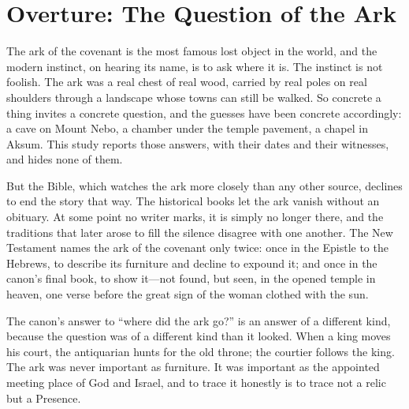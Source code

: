 \section{Overture: The Question of the Ark}

The ark of the covenant is the most famous lost object in the world,
and the modern instinct, on hearing its name, is to ask where it is.
The instinct is not foolish. The ark was a real chest of real wood,
carried by real poles on real shoulders through a landscape whose towns
can still be walked. So concrete a thing invites a concrete question,
and the guesses have been concrete accordingly: a cave on Mount Nebo, a
chamber under the temple pavement, a chapel in Aksum. This study
reports those answers, with their dates and their witnesses, and hides
none of them.

But the Bible, which watches the ark more closely than any other
source, declines to end the story that way. The historical books let
the ark vanish without an obituary. At some point no writer marks, it
is simply no longer there, and the traditions that later arose to fill
the silence disagree with one another. The New Testament names the ark
of the covenant only twice: once in the Epistle to the Hebrews, to
describe its furniture and decline to expound it; and once in the
canon's final book, to show it---not found, but seen, in the opened
temple in heaven, one verse before the great sign of the woman clothed
with the sun.

The canon's answer to ``where did the ark go?'' is an answer of a
different kind, because the question was of a different kind than it
looked. When a king moves his court, the antiquarian hunts for the old
throne; the courtier follows the king. The ark was never important as
furniture. It was important as the appointed meeting place of God and
Israel, and to trace it honestly is to trace not a relic but a
Presence.


